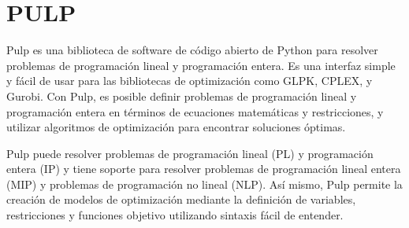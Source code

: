 \documentclass{beamer}
\begin{document}
\section{PULP}

\begin{frame}
    Pulp es una biblioteca de software de código abierto de Python para resolver problemas de programación lineal y programación entera. Es una interfaz simple y fácil de usar para las bibliotecas de optimización como GLPK, CPLEX, y Gurobi. Con Pulp, es posible definir problemas de programación lineal y programación entera en términos de ecuaciones matemáticas y restricciones, y utilizar algoritmos de optimización para encontrar soluciones óptimas.
\end{frame}
\begin{frame}
    Pulp puede resolver problemas de programación lineal (PL) y programación entera (IP) y tiene soporte para resolver problemas de programación lineal entera (MIP) y problemas de programación no lineal (NLP).
 Así mismo, Pulp permite la creación de modelos de optimización mediante la definición de variables, restricciones y funciones objetivo utilizando sintaxis fácil de entender. 
\end{frame}
\backmatter
\end{document}
